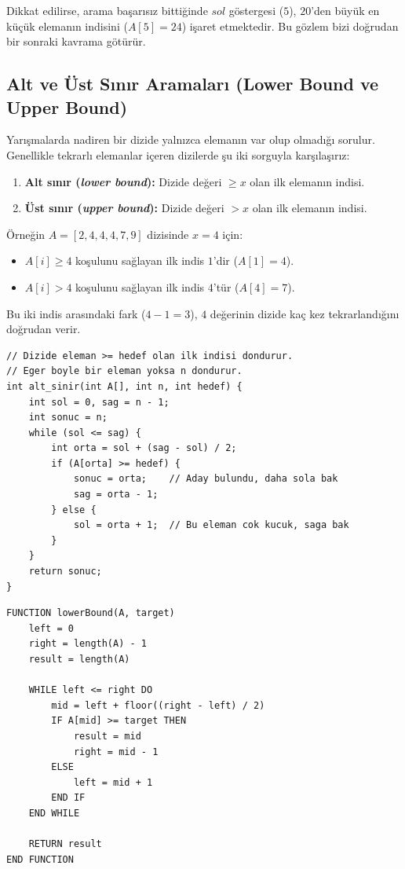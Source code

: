 Dikkat edilirse, arama başarısız bittiğinde $sol$ göstergesi ($5$), $20$'den büyük en küçük elemanın indisini ($A[5]=24$) işaret etmektedir. Bu gözlem bizi doğrudan bir sonraki kavrama götürür.

\subsection{Alt ve Üst Sınır Aramaları (Lower Bound ve Upper Bound)}

Yarışmalarda nadiren bir dizide yalnızca elemanın var olup olmadığı sorulur. Genellikle tekrarlı elemanlar içeren dizilerde şu iki sorguyla karşılaşırız:
\begin{enumerate}
    \item \textbf{Alt sınır (\emph{lower bound}):} Dizide değeri $\ge x$ olan ilk elemanın indisi.
    \item \textbf{Üst sınır (\emph{upper bound}):} Dizide değeri $> x$ olan ilk elemanın indisi.
\end{enumerate}

Örneğin $A = [2, 4, 4, 4, 7, 9]$ dizisinde $x = 4$ için:
\begin{itemize}
    \item $A[i] \ge 4$ koşulunu sağlayan ilk indis $1$'dir ($A[1] = 4$).
    \item $A[i] > 4$ koşulunu sağlayan ilk indis $4$'tür ($A[4] = 7$).
\end{itemize}
Bu iki indis arasındaki fark ($4 - 1 = 3$), $4$ değerinin dizide kaç kez tekrarlandığını doğrudan verir.

\begin{lstlisting}[language=CTemel]
// Dizide eleman >= hedef olan ilk indisi dondurur.
// Eger boyle bir eleman yoksa n dondurur.
int alt_sinir(int A[], int n, int hedef) {
    int sol = 0, sag = n - 1;
    int sonuc = n;
    while (sol <= sag) {
        int orta = sol + (sag - sol) / 2;
        if (A[orta] >= hedef) {
            sonuc = orta;    // Aday bulundu, daha sola bak
            sag = orta - 1;
        } else {
            sol = orta + 1;  // Bu eleman cok kucuk, saga bak
        }
    }
    return sonuc;
}
\end{lstlisting}

\begin{lstlisting}
FUNCTION lowerBound(A, target)
    left = 0
    right = length(A) - 1
    result = length(A)

    WHILE left <= right DO
        mid = left + floor((right - left) / 2)
        IF A[mid] >= target THEN
            result = mid
            right = mid - 1
        ELSE
            left = mid + 1
        END IF
    END WHILE

    RETURN result
END FUNCTION\end{lstlisting}

